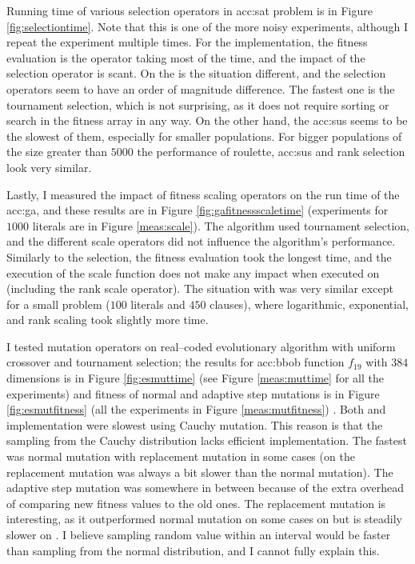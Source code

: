 Running time of various selection operators in \acrshort{acc:sat} problem is in Figure \ref{fig:selectiontime}. Note that this is one of the more noisy experiments, although I repeat the experiment multiple times. For the \cpu implementation, the fitness evaluation is the operator taking most of the time, and the impact of the selection operator is scant. On the \gpu is the situation different, and the selection operators seem to have an order of magnitude difference. The fastest one is the tournament selection, which is not surprising, as it does not require sorting or search in the fitness array in any way. On the other hand, the \acrshort{acc:sus} seems to be the slowest of them, especially for smaller populations. For bigger populations of the size greater than $5000$ the performance of roulette, \acrshort{acc:sus} and rank selection look very similar.

Lastly, I measured the impact of fitness scaling operators on the run time of the \acrshort{acc:ga}, and these results are in Figure \ref{fig:gafitnessscaletime} (experiments for $1000$ literals are in Figure \ref{meas:scale}). The algorithm used tournament selection, and the different scale operators did not influence the algorithm's performance. Similarly to the selection, the fitness evaluation took the longest time, and the execution of the scale function does not make any impact when executed on \cpu (including the rank scale operator). The situation with \gpu was very similar except for a small problem ($100$ literals and $450$ clauses), where logarithmic, exponential, and rank scaling took slightly more time.

I tested mutation operators on real--coded evolutionary algorithm with uniform crossover and tournament selection; the results for \acrshort{acc:bbob} function $f_{19}$ with $384$ dimensions is in Figure \ref{fig:esmuttime} (see Figure \ref{meas:muttime} for all the experiments) and fitness of normal and adaptive step mutations is in Figure \ref{fig:esmutfitness} (all the experiments in Figure \ref{meas:mutfitness}) . Both \cpu and \gpu implementation were slowest using Cauchy mutation. This reason is that the sampling from the Cauchy distribution lacks efficient implementation. The fastest was normal mutation with replacement mutation in some \gpu cases (on \cpu the replacement mutation was always a bit slower than the normal mutation). The adaptive step mutation was somewhere in between because of the extra overhead of comparing new fitness values to the old ones. The replacement mutation is interesting, as it outperformed normal mutation on some cases on \gpu but is steadily slower on \cpuns. I believe sampling random value within an interval would be faster than sampling from the normal distribution, and I cannot fully explain this.

